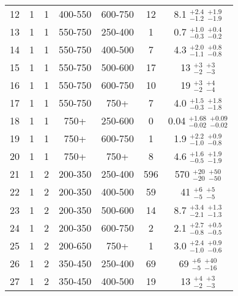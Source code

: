 \begin{table}[tbp]
{\begin{tabular}{ccccc  cc}
        12 &          1 &          1 &    400-550 &    600-750 &         12 &   8.1 $^{ +2.4} _{ -1.2}$ $^{ +1.9} _{ -1.9}$ \\
        13 &          1 &          1 &    550-750 &    250-400 &          1 &   0.7 $^{ +1.0} _{ -0.3}$ $^{ +0.4} _{ -0.2}$ \\
        14 &          1 &          1 &    550-750 &    400-500 &          7 &   4.3 $^{ +2.0} _{ -1.1}$ $^{ +0.8} _{ -0.8}$ \\
        15 &          1 &          1 &    550-750 &    500-600 &         17 &    13 $^{   +3} _{   -2}$ $^{   +3} _{   -3}$ \\
        16 &          1 &          1 &    550-750 &    600-750 &         10 &    19 $^{   +3} _{   -2}$ $^{   +4} _{   -4}$ \\
        17 &          1 &          1 &    550-750 &       750+ &          7 &   4.0 $^{ +1.5} _{ -0.3}$ $^{ +1.8} _{ -1.8}$ \\
        18 &          1 &          1 &       750+ &    250-600 &          0 &  0.04 $^{+1.68} _{-0.02}$ $^{+0.09} _{-0.02}$ \\
        19 &          1 &          1 &       750+ &    600-750 &          1 &   1.9 $^{ +2.2} _{ -1.0}$ $^{ +0.9} _{ -0.8}$ \\
        20 &          1 &          1 &       750+ &       750+ &          8 &   4.6 $^{ +1.6} _{ -0.5}$ $^{ +1.9} _{ -1.9}$ \\
 \hline
        21 &          1 &          2 &    200-350 &    250-400 &        596 &   570 $^{  +20} _{  -20}$ $^{  +50} _{  -50}$ \\
        22 &          1 &          2 &    200-350 &    400-500 &         59 &    41 $^{   +6} _{   -5}$ $^{   +5} _{   -5}$ \\
        23 &          1 &          2 &    200-350 &    500-600 &         14 &   8.7 $^{ +3.4} _{ -2.1}$ $^{ +1.3} _{ -1.3}$ \\
        24 &          1 &          2 &    200-350 &    600-750 &          2 &   2.1 $^{ +2.7} _{ -0.8}$ $^{ +0.5} _{ -0.5}$ \\
        25 &          1 &          2 &    200-650 &       750+ &          1 &   3.0 $^{ +2.4} _{ -1.0}$ $^{ +0.9} _{ -0.6}$ \\
        26 &          1 &          2 &    350-450 &    250-400 &         69 &    69 $^{   +6} _{   -5}$ $^{  +40} _{  -16}$ \\
        27 &          1 &          2 &    350-450 &    400-500 &         19 &    13 $^{   +4} _{   -2}$ $^{   +3} _{   -3}$ \\

\end{tabular}}
\end{table}
